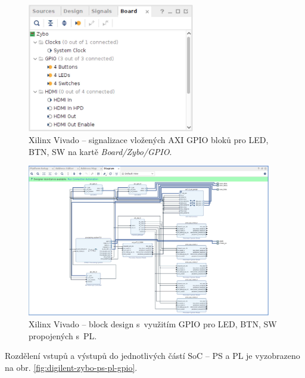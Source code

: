 \documentclass[a4paper, twoside, 11pt]{article}
\begin{document}
\begin{appendices}
		\begin{figure}[htbp!]
			\centering
			\includegraphics[width=0.65\textwidth]{src/png/zybo-xilinx-vivado-flow/zybo-xilinx-vivado-flow-38.jpg}
			\caption{Xilinx Vivado – signalizace vložených AXI GPIO bloků pro LED, BTN, SW na kartě \textit{Board/Zybo/GPIO}.}
			\label{fig:zybo-xilinx-vivado-flow-38}
		\end{figure}

		\begin{figure}[htbp!]
			\centering
			\includegraphics[width=0.95\textwidth]{src/png/zybo-xilinx-vivado-flow/zybo-xilinx-vivado-flow-37.jpg}
			\caption{Xilinx Vivado – block design s~využitím GPIO pro LED, BTN, SW propojených s~PL.}
			\label{fig:zybo-xilinx-vivado-flow-37}
		\end{figure}

		Rozdělení vstupů a výstupů do jednotlivých částí SoC – PS a PL je vyzobrazeno na obr. \ref{fig:digilent-zybo-ps-pl-gpio}.


\end{appendices}
\end{document}
